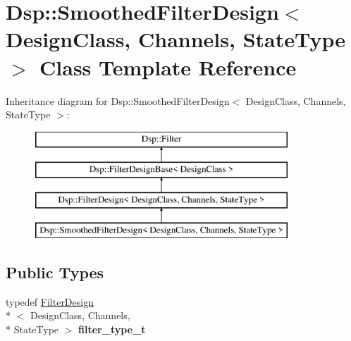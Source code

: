\hypertarget{classDsp_1_1SmoothedFilterDesign}{\section{Dsp\-:\-:Smoothed\-Filter\-Design$<$ Design\-Class, Channels, State\-Type $>$ Class Template Reference}
\label{classDsp_1_1SmoothedFilterDesign}
}
Inheritance diagram for Dsp\-:\-:Smoothed\-Filter\-Design$<$ Design\-Class, Channels, State\-Type $>$\-:\begin{figure}[H]
\begin{center}
\leavevmode
\includegraphics[height=4.000000cm]{classDsp_1_1SmoothedFilterDesign}
\end{center}
\end{figure}
\subsection*{Public Types}
\begin{DoxyCompactItemize}
\item 
\hypertarget{classDsp_1_1SmoothedFilterDesign_a3118aa649332c2654234157c8a7e280b}{typedef \hyperlink{classDsp_1_1FilterDesign}{Filter\-Design}\\*
$<$ Design\-Class, Channels, \\*
State\-Type $>$ {\bfseries filter\-\_\-type\-\_\-t}}\label{classDsp_1_1SmoothedFilterDesign_a3118aa649332c2654234157c8a7e280b}

\end{DoxyCompactItemize}
